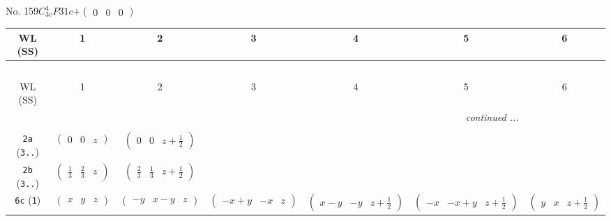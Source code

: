 \documentclass[fleqn,9pt,landscape]{jsarticle}
\begin{document}
\newpage
No. 159\quad$C_{3v}^{4}$\quad$P31c$\quad[ trigonal ]\quad$+\begin{pmatrix} 0 & 0 & 0 \end{pmatrix}$
\begin{center}
\renewcommand{\arraystretch}{1.2}
\begin{longtable}{ccccccc}
 \hline \hline
WL (SS) & 1 & 2 & 3 & 4 & 5 & 6 \\ \hline \endfirsthead

\multicolumn{6}{l}{\tablename\ \thetable{}} \\
 \hline \hline
WL (SS) & 1 & 2 & 3 & 4 & 5 & 6 \\ \hline \endhead

 \hline \hline
\multicolumn{6}{r}{\footnotesize\it continued ...} \\ \endfoot

 \hline \hline
\multicolumn{6}{r}{} \\ \endlastfoot

{\tt 2a} ({\tt 3..}) & $ \begin{pmatrix} 0 & 0 & z \end{pmatrix} $ & $ \begin{pmatrix} 0 & 0 & z + \frac{1}{2} \end{pmatrix} $ & $  $ & $  $ & $  $ & $  $ \\ \hline
{\tt 2b} ({\tt 3..}) & $ \begin{pmatrix} \frac{1}{3} & \frac{2}{3} & z \end{pmatrix} $ & $ \begin{pmatrix} \frac{2}{3} & \frac{1}{3} & z + \frac{1}{2} \end{pmatrix} $ & $  $ & $  $ & $  $ & $  $ \\ \hline
{\tt 6c} ({\tt 1}) & $ \begin{pmatrix} x & y & z \end{pmatrix} $ & $ \begin{pmatrix} - y & x - y & z \end{pmatrix} $ & $ \begin{pmatrix} - x + y & - x & z \end{pmatrix} $ & $ \begin{pmatrix} x - y & - y & z + \frac{1}{2} \end{pmatrix} $ & $ \begin{pmatrix} - x & - x + y & z + \frac{1}{2} \end{pmatrix} $ & $ \begin{pmatrix} y & x & z + \frac{1}{2} \end{pmatrix} $ \\
\end{longtable}
\end{center}
\end{document}
